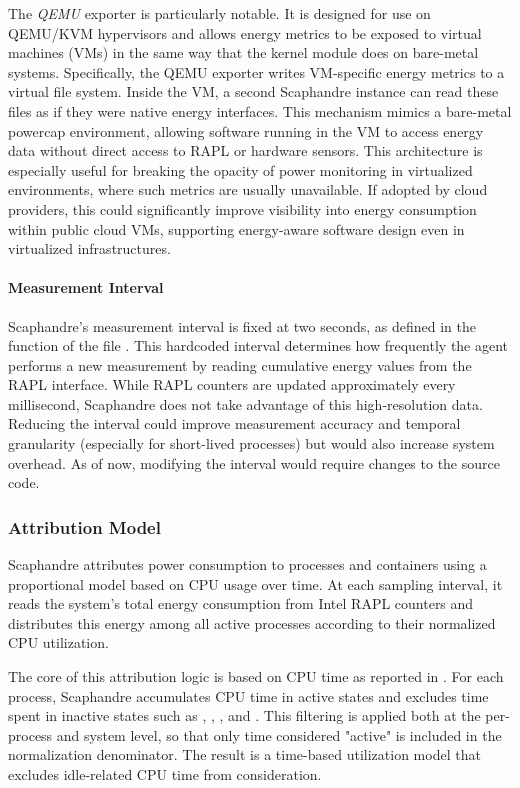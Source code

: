 The \textit{QEMU} exporter is particularly notable. It is designed for use on QEMU/KVM hypervisors and allows energy metrics to be exposed to virtual machines (VMs) in the same way that the  kernel module does on bare-metal systems. Specifically, the QEMU exporter writes VM-specific energy metrics to a virtual file system. Inside the VM, a second Scaphandre instance can read these files as if they were native energy interfaces. This mechanism mimics a bare-metal powercap environment, allowing software running in the VM to access energy data without direct access to RAPL or hardware sensors. This architecture is especially useful for breaking the opacity of power monitoring in virtualized environments, where such metrics are usually unavailable. If adopted by cloud providers, this could significantly improve visibility into energy consumption within public cloud VMs, supporting energy-aware software design even in virtualized infrastructures.

\paragraph{Measurement Interval}
Scaphandre's measurement interval is fixed at two seconds, as defined in the  function of the file . This hardcoded interval determines how frequently the agent performs a new measurement by reading cumulative energy values from the RAPL interface. While RAPL counters are updated approximately every millisecond, Scaphandre does not take advantage of this high-resolution data. Reducing the interval could improve measurement accuracy and temporal granularity (especially for short-lived processes) but would also increase system overhead. As of now, modifying the interval would require changes to the source code.

\subsubsection{Attribution Model}
\label{sec:scaphandre-attribution}

Scaphandre attributes power consumption to processes and containers using a proportional model based on CPU usage over time. At each sampling interval, it reads the system's total energy consumption from Intel RAPL counters and distributes this energy among all active processes according to their normalized CPU utilization.

The core of this attribution logic is based on CPU time as reported in . For each process, Scaphandre accumulates CPU time in active states and excludes time spent in inactive states such as , , , and . This filtering is applied both at the per-process and system level, so that only time considered "active" is included in the normalization denominator. The result is a time-based utilization model that excludes idle-related CPU time from consideration.

